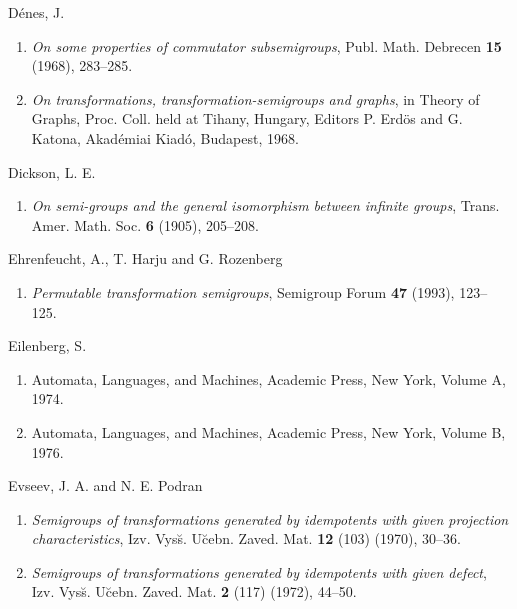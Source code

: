 \documentclass{surv-l}
\numberwithin{equation}{section}
\numberwithin{table}{section}
\numberwithin{figure}{section}
\theoremstyle{plain}
\theoremstyle{definition}
\begin{document}
\begin{thebibliography}{}
\item[] D\'{e}nes, J.
\begin{enumerate}
\item \label{bib11} \emph{On some properties of commutator subsemigroups},
Publ. Math. Debrecen \textbf{15} (1968), 283--285.

\item \label{bib11a} \emph{On transformations, transformation-semigroups and
graphs}, in Theory of Graphs, Proc. Coll. held at Tihany,
Hungary, Editors P. Erd\"{o}s and G. Katona, Akad\'{e}miai
Kiad\'{o}, Budapest, 1968.
\end{enumerate}

\item[] Dickson, L. E.
\begin{enumerate}
\item \label{bib12} \emph{On semi-groups and the general isomorphism
between infinite groups}, Trans. Amer. Math. Soc.
\textbf{6} (1905), 205--208.
\end{enumerate}

\item[] Ehrenfeucht, A., T. Harju and G. Rozenberg
\begin{enumerate}
\item \label{bib13} \emph{Permutable transformation semigroups}, Semigroup
Forum \textbf{47} (1993), 123--125.
\end{enumerate}

\item[] Eilenberg, S.
\begin{enumerate}
\item \label{bib14} Automata, Languages, and Machines, Academic Press, New
York, Volume A, 1974.

\item \label{bib14a} Automata, Languages, and Machines, Academic Press, New
York, Volume B, 1976.
\end{enumerate}

\item[] Evseev, J. A. and N. E. Podran
\begin{enumerate}
\item \label{bib15} \emph{Semigroups of transformations generated by
idempotents with given projection characteristics}, Izv.
Vys\u{s}. U\u{c}ebn. Zaved. Mat. \textbf{12} (103) (1970),
30--36.

\item \label{bib15a} \emph{Semigroups of transformations generated by
idempotents with given defect}, Izv. Vys\u{s}. U\u{c}ebn.
Zaved. Mat. \textbf{2} (117) (1972), 44--50.
\end{enumerate}


\end{thebibliography}
\end{document}
